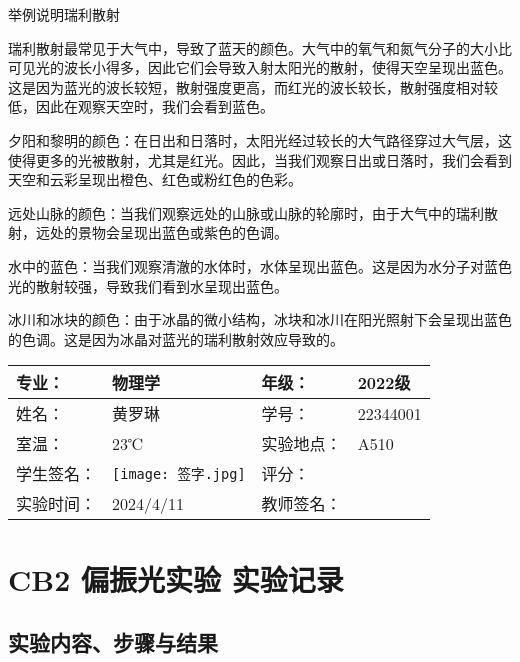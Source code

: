\documentclass[dvipsnames, svgnames,a4paper,11pt]{article}
\begin{document}
	\begin{question}
		举例说明瑞利散射
	\end{question}
	瑞利散射最常见于大气中，导致了蓝天的颜色。大气中的氧气和氮气分子的大小比可见光的波长小得多，因此它们会导致入射太阳光的散射，使得天空呈现出蓝色。这是因为蓝光的波长较短，散射强度更高，而红光的波长较长，散射强度相对较低，因此在观察天空时，我们会看到蓝色。

夕阳和黎明的颜色：在日出和日落时，太阳光经过较长的大气路径穿过大气层，这使得更多的光被散射，尤其是红光。因此，当我们观察日出或日落时，我们会看到天空和云彩呈现出橙色、红色或粉红色的色彩。

远处山脉的颜色：当我们观察远处的山脉或山脉的轮廓时，由于大气中的瑞利散射，远处的景物会呈现出蓝色或紫色的色调。

水中的蓝色：当我们观察清澈的水体时，水体呈现出蓝色。这是因为水分子对蓝色光的散射较强，导致我们看到水呈现出蓝色。

冰川和冰块的颜色：由于冰晶的微小结构，冰块和冰川在阳光照射下会呈现出蓝色的色调。这是因为冰晶对蓝光的瑞利散射效应导致的。

	
	
	
	
	\clearpage
	
	\begin{table}
		\renewcommand\arraystretch{1.7}
		\centering
		\begin{tabularx}{\textwidth}{|X|X|X|X|}
			\hline
			专业： & 物理学 & 年级： & 2022级 \\
			\hline
			姓名： & 黄罗琳& 学号： & 22344001\\
			\hline
			室温： & 23℃ & 实验地点： & A510 \\
			\hline
			学生签名：& \texttt{[image: 签字.jpg]} & 评分： &\\
			\hline
			实验时间：& 2024/4/11 & 教师签名：&\\
			\hline
		\end{tabularx}
	\end{table}
	
	\section{CB2 偏振光实验 \quad\heiti 实验记录}
	
	\subsection{实验内容、步骤与结果}
	
\end{document}
